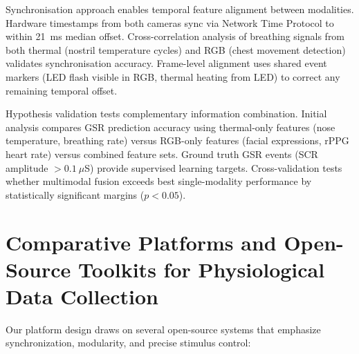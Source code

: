\documentclass{report}
\begin{document}
    Synchronisation approach enables temporal feature alignment between modalities. Hardware timestamps from both cameras sync via Network Time Protocol to within 21~ms median offset. Cross-correlation analysis of breathing signals from both thermal (nostril temperature cycles) and RGB (chest movement detection) validates synchronisation accuracy. Frame-level alignment uses shared event markers (LED flash visible in RGB, thermal heating from LED) to correct any remaining temporal offset.

    Hypothesis validation tests complementary information combination. Initial analysis compares GSR prediction accuracy using thermal-only features (nose temperature, breathing rate) versus RGB-only features (facial expressions, rPPG heart rate) versus combined feature sets. Ground truth GSR events (SCR amplitude $>0.1~\mu$S) provide supervised learning targets. Cross-validation tests whether multimodal fusion exceeds best single-modality performance by statistically significant margins ($p < 0.05$).


    \section{Comparative Platforms and Open-Source Toolkits for Physiological Data Collection}
    \label{sec:platforms}

    Our platform design draws on several open-source systems that emphasize synchronization, modularity, and precise stimulus control:
\end{document}
